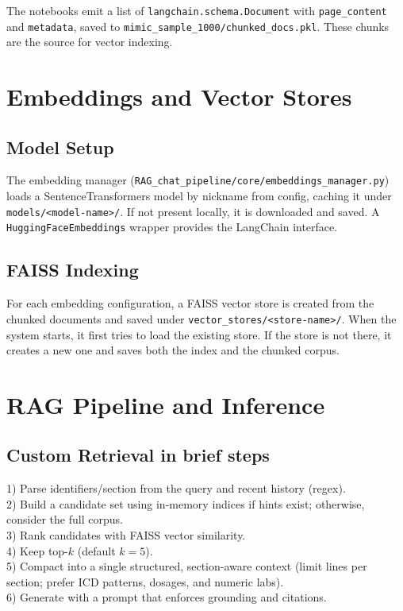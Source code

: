 \noindent The notebooks emit a list of \texttt{langchain.schema.Document} with \texttt{page\_content} and \texttt{metadata}, saved to \texttt{mimic\_sample\_1000/chunked\_docs.pkl}. These chunks are the source for vector indexing.

\section{Embeddings and Vector Stores}

\subsection{Model Setup}
The embedding manager (\texttt{RAG\_chat\_pipeline/core/embeddings\_manager.py}) loads a SentenceTransformers model by nickname from config, caching it under \texttt{models/<model-name>/}. If not present locally, it is downloaded and saved. A \texttt{HuggingFaceEmbeddings} wrapper provides the LangChain interface.

\subsection{FAISS Indexing}
For each embedding configuration, a FAISS vector store is created from the chunked documents and saved under \texttt{vector\_stores/<store-name>/}. When the system starts, it first tries to load the existing store. If the store is not there, it creates a new one and saves both the index and the chunked corpus.
\newpage
\section{RAG Pipeline and Inference}

\subsection{Custom Retrieval in brief steps}
1) Parse identifiers/section from the query and recent history (regex).\\
2) Build a candidate set using in-memory indices if hints exist; otherwise, consider the full corpus.\\
3) Rank candidates with FAISS vector similarity.\\
4) Keep top-\(k\) (default \(k=5\)).\\
5) Compact into a single structured, section-aware context (limit lines per section; prefer ICD patterns, dosages, and numeric labs).\\
6) Generate with a prompt that enforces grounding and citations.

